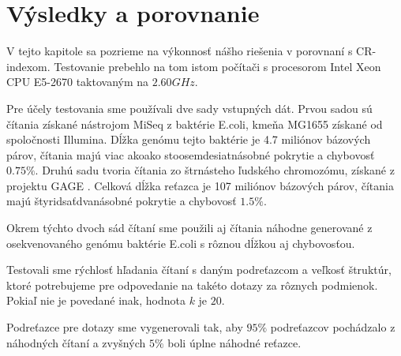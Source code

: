 \chapter{Výsledky a porovnanie}

V tejto kapitole sa pozrieme na výkonnosť nášho riešenia v porovnaní
s CR-indexom. Testovanie prebehlo na tom istom počítači s procesorom
Intel Xeon CPU E5-2670 taktovaným na $2.60 GHz$.

Pre účely testovania sme používali dve sady vstupných dát. Prvou sadou sú
čítania získané nástrojom MiSeq z baktérie E.coli, kmeňa MG1655
získané od spoločnosti Illumina. Dĺžka genómu tejto baktérie je 4.7 miliónov bázových párov, čítania
majú viac akoako
stoosemdesiatnásobné pokrytie a chybovosť $0.75\%$. Druhú sadu tvoria čítania zo štrnásteho ľudského
chromozómu, získané z projektu GAGE \cite{gage}. Celková dĺžka reťazca je 107 miliónov bázových párov,
čítania majú štyridsaťdvanásobné pokrytie a chybovosť $1.5\%$.

Okrem týchto dvoch sád čítaní sme použili aj čítania náhodne generované z osekvenovaného
genómu baktérie E.coli s rôznou dĺžkou aj chybovosťou.

Testovali sme rýchlosť hľadania čítaní s daným podreťazcom a veľkosť štruktúr, ktoré potrebujeme pre odpovedanie
na takéto dotazy za rôznych podmienok. Pokiaľ nie je povedané inak, hodnota $k$ je $20$.

Podreťazce pre dotazy sme vygenerovali tak, aby $95\%$ podreťazcov
pochádzalo z náhodných čítaní a zvyšných $5\%$ boli úplne náhodné reťazce.


